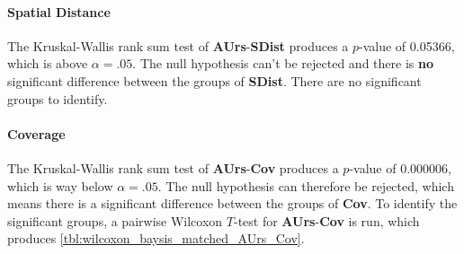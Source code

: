 \paragraph{Spatial Distance}
The Kruskal-Wallis rank sum test of \textbf{AUrs}-\textbf{SDist} produces a $p$-value of 0.05366, which is above $\alpha=.05$. The null hypothesis can't be rejected and there is \textbf{no} significant difference between the groups of \textbf{SDist}. There are no significant groups to identify.

\paragraph{Coverage}
The Kruskal-Wallis rank sum test of \textbf{AUrs}-\textbf{Cov} produces a $p$-value of 0.000006, which is way below $\alpha=.05$. The null hypothesis can therefore be rejected, which means there is a significant difference between the groups of \textbf{Cov}. To identify the significant groups, a pairwise Wilcoxon $T$-test for \textbf{AUrs}-\textbf{Cov} is run, which produces \cref{tbl:wilcoxon_baysis_matched_AUrs_Cov}.
